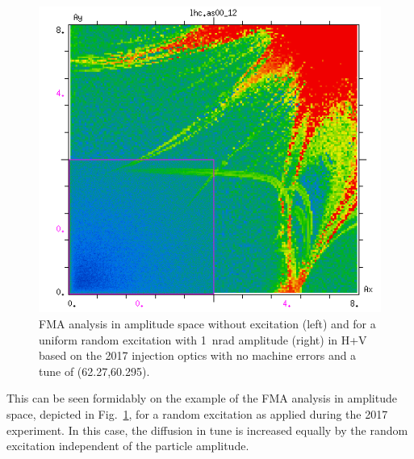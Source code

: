 \documentclass[%
 reprint,
 amsmath,amssymb,
 aps,
prstab,
]{revtex4-1}
\begin{document}
\begin{figure}[h]
\begin{minipage}[t]{0.49\linewidth}
		\includegraphics[width=1.0\linewidth]{2017injnocolc15o+19_6noerruranadthv_1nrad_dp0_amp.png}
	\end{minipage}	
	\caption{\label{fig:ran2017fmaamp} FMA analysis in amplitude space without excitation (left) and for a uniform random excitation with 1~nrad amplitude (right) in H+V based on the 2017 injection optics with no machine errors and a tune of (62.27,60.295).}
\end{figure}
This can be seen formidably on the example of the FMA analysis in amplitude space, depicted in Fig.~\ref{fig:ran2017fmaamp}, for a random excitation as applied during the 2017 experiment. In this case, the diffusion in tune is increased equally by the random excitation independent of the particle amplitude.
\end{document}

